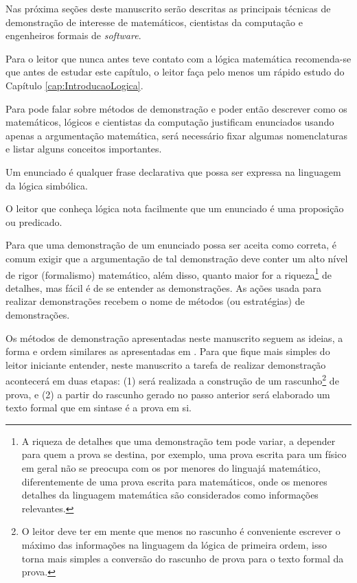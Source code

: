 Nas próxima seções deste manuscrito serão descritas as principais técnicas de demonstração de interesse de matemáticos, cientistas da computação e engenheiros formais de \textit{software}. 

\begin{remark}
    Para o leitor que nunca antes teve contato com a lógica matemática recomenda-se que antes de estudar este capítulo, o leitor faça pelo menos um rápido estudo do Capítulo \ref{cap:IntroducaoLogica}.
\end{remark}

Para pode falar sobre métodos de demonstração e poder então descrever como os matemáticos, lógicos e cientistas da computação justificam enunciados usando apenas a argumentação matemática, será necessário fixar algumas nomenclaturas e listar alguns conceitos importantes.

\begin{definition}[Enunciado]\label{def:Enunciado}
	Um enunciado é qualquer frase declarativa que possa ser expressa na linguagem da lógica simbólica.
\end{definition}

\begin{remark}
    O leitor que conheça lógica nota facilmente que um enunciado é uma proposição ou predicado.
\end{remark}

Para que uma demonstração de um enunciado possa ser aceita como correta, é comum exigir que a argumentação de tal demonstração deve conter um alto nível de rigor (formalismo) matemático, além disso, quanto maior for a riqueza\footnote{A riqueza de detalhes que uma demonstração tem pode variar, a depender para quem a prova se destina, por exemplo, uma prova escrita para um físico em geral não se preocupa com os por menores do linguajá matemático, diferentemente de uma prova escrita para matemáticos, onde os menores detalhes da linguagem matemática são considerados como informações relevantes.} de detalhes, mas fácil é de se entender as demonstrações. As ações usada para realizar demonstrações recebem o nome de métodos (ou estratégias) de demonstrações.

Os métodos de demonstração apresentadas neste manuscrito seguem as ideias, a forma e ordem similares as apresentadas em \cite{velleman2019comProvar}. Para que fique mais simples do leitor iniciante entender, neste manuscrito a tarefa de realizar demonstração acontecerá em duas etapas: (1) será realizada a construção de um rascunho\footnote{O leitor deve ter em mente que menos no rascunho é conveniente escrever o máximo das informações na linguagem da lógica de primeira ordem, isso torna mais simples a conversão do rascunho de prova para o texto formal da prova.} de prova, e (2) a partir do rascunho gerado no passo anterior será elaborado um texto formal que em sintase é a prova em si.

